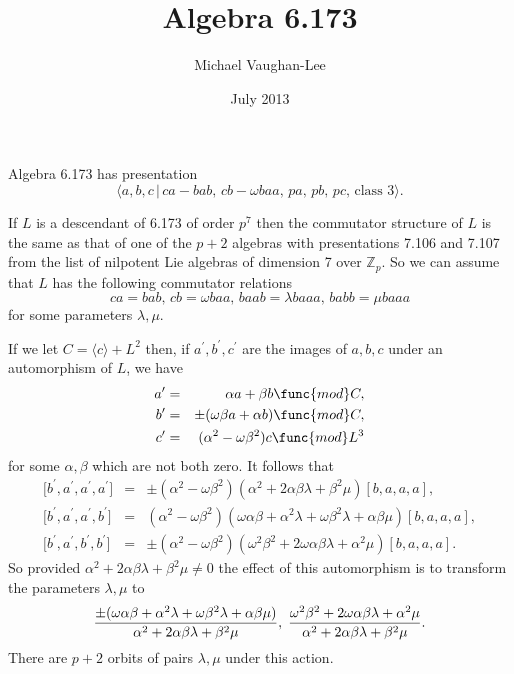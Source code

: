 \documentclass[12pt]{article}
\begin{document}
\title{Algebra 6.173}
\author{Michael Vaughan-Lee}
\date{July 2013}
\maketitle

Algebra 6.173 has presentation 
\[
\langle a,b,c\,|\,ca-bab,\,cb-\omega baa,\,pa,\,pb,\,pc,\,\text{class }%
3\rangle .
\]

If $L$ is a descendant of 6.173 of order $p^{7}$ then the commutator
structure of $L$ is the same as that of one of the $p+2$ algebras with
presentations 7.106 and 7.107 from the list of nilpotent Lie algebras of
dimension 7 over $\mathbb{Z}_{p}$. So we can assume that $L$ has the
following commutator relations 
\[
ca=bab,\,cb=\omega baa,\,baab=\lambda baaa,\,babb=\mu baaa
\]%
for some parameters $\lambda ,\mu $.

If we let $C=\langle c\rangle +L^{2}$ then, if $a^{\prime },b^{\prime
},c^{\prime }$ are the images of $a,b,c$ under an automorphism of $L$, we
have 
\begin{eqnarray*}
a^{\prime } &=&\alpha a+\beta b\func{mod}C, \\
b^{\prime } &=&\pm (\omega \beta a+\alpha b)\func{mod}C, \\
c^{\prime } &=&(\alpha ^{2}-\omega \beta ^{2})c\func{mod}L^{3}
\end{eqnarray*}%
for some $\alpha ,\beta $ which are not both zero.  It follows that 
\begin{eqnarray*}
\lbrack b^{\prime },a^{\prime },a^{\prime },a^{\prime }] &=&\pm (\alpha
^{2}-\omega \beta ^{2})(\alpha ^{2}+2\alpha \beta \lambda +\beta ^{2}\mu
)[b,a,a,a], \\
\lbrack b^{\prime },a^{\prime },a^{\prime },b^{\prime }] &=&(\alpha
^{2}-\omega \beta ^{2})(\omega \alpha \beta +\alpha ^{2}\lambda +\omega
\beta ^{2}\lambda +\alpha \beta \mu )[b,a,a,a], \\
\lbrack b^{\prime },a^{\prime },b^{\prime },b^{\prime }] &=&\pm (\alpha
^{2}-\omega \beta ^{2})(\omega ^{2}\beta ^{2}+2\omega \alpha \beta \lambda
+\alpha ^{2}\mu )[b,a,a,a].
\end{eqnarray*}%
So provided $\alpha ^{2}+2\alpha \beta \lambda +\beta ^{2}\mu \neq 0$ the
effect of this automorphism is to transform the parameters $\lambda ,\mu $ to%
\[
\frac{\pm (\omega \alpha \beta +\alpha ^{2}\lambda +\omega \beta ^{2}\lambda
+\alpha \beta \mu )}{\alpha ^{2}+2\alpha \beta \lambda +\beta ^{2}\mu },\;%
\frac{\omega ^{2}\beta ^{2}+2\omega \alpha \beta \lambda +\alpha ^{2}\mu }{%
\alpha ^{2}+2\alpha \beta \lambda +\beta ^{2}\mu }.
\]%
There are $p+2$ orbits of pairs $\lambda ,\mu $ under this action.
\end{document}
